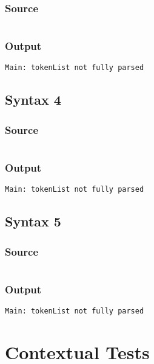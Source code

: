 \documentclass[twoside]{report}
\begin{document}
\subsection{Source}
\inputminted[tabsize=4,linenos,firstnumber=1]{text}{../../src/haskell/PP-project-2017/test/syntax3.shl}
\subsection{Output}
\begin{verbatim}
Main: tokenList not fully parsed
\end{verbatim}

\section{Syntax 4}
\subsection{Source}
\inputminted[tabsize=4,linenos,firstnumber=1]{text}{../../src/haskell/PP-project-2017/test/syntax4.shl}
\subsection{Output}
\begin{verbatim}
Main: tokenList not fully parsed
\end{verbatim}

\section{Syntax 5}
\subsection{Source}
\inputminted[tabsize=4,linenos,firstnumber=1]{text}{../../src/haskell/PP-project-2017/test/syntax5.shl}
\subsection{Output}
\begin{verbatim}
Main: tokenList not fully parsed
\end{verbatim}


\chapter{Contextual Tests}
\end{document}

